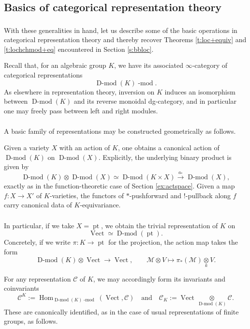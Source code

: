\documentclass[10pt]{amsart}
\newcommand{\sM}{\mathscr{M}}
\newcommand{\on}{\operatorname}
\renewcommand{\mod}{\on{-mod}}
\newcommand{\Dmod}{\on{D-mod}}
\newcommand{\Vect}{\on{Vect}}
\theoremstyle{remark}
\newcommand{\Hom}{\operatorname{Hom}}
\numberwithin{equation}{section}
\newcommand{\sC}{\mathscr{C}}
\renewcommand{\mod}{\operatorname{-mod}}
\begin{document}
\subsection{Basics of categorical representation theory}

\subsubsection{} With these generalities in hand, let us describe some of the 
basic operations in categorical representation theory and thereby recover Theorems \ref{t:loc+equiv} and \ref{t:lochchmod+eq} encountered in Section \ref{s:bbloc}. 


Recall that, for an algebraic group $K$, we have its associated $\infty$-category of 
categorical representations 
%
\[
   \Dmod(K)\mod.
\]
%
As elsewhere in representation theory, inversion on $K$ induces an isomorphism 
between $\Dmod(K)$ and its reverse monoidal dg-category, and in particular one 
may freely pass between left and right modules. 



\subsubsection{} A basic family of representations may be constructed 
geometrically as follows. 

Given a variety $X$ with an action of $K$, one obtains a canonical action of 
$\Dmod(K)$ on $\Dmod(X)$. Explicitly, the underlying binary product is given by 
%
\[
   \Dmod(K) \otimes \Dmod(X) \simeq \Dmod(K \times X) \xrightarrow{a_*} 
   \Dmod(X),
\]
%
exactly as in the function-theoretic case of Section \ref{ex:actspace}. Given a 
map $f: X \rightarrow X'$ of $K$-varieties, the functors of $*$-pushforward and 
$!$-pullback along $f$ carry canonical data of $K$-equivariance. 

\subsubsection{} In particular, if we take $X = \on{pt}$, we obtain the trivial 
representation of $K$ on 
%
\[
    \on{Vect} \simeq \Dmod(\on{pt}).
\]
%
Concretely, if we write $\pi: K \rightarrow \on{pt}$ for the projection, the 
action map takes the form 
%
\[
    \Dmod(K) \otimes \Vect \rightarrow \Vect, \quad \quad \sM \otimes V \mapsto 
    \pi_*(\sM) \underset k \otimes  V.
\]
%


For any representation $\sC$ of $K$, we may accordingly form its invariants and 
coinvariants 
%
\[
 \sC^K := \Hom_{\Dmod(K)\mod}(\on{Vect}, \sC) \quad \text{and} \quad \sC_K := 
 \on{Vect} \underset {\Dmod(K)} \otimes \sC.
\]
%
These are canonically identified, as in the case of usual representations of 
finite groups, as follows. 
\end{document}
